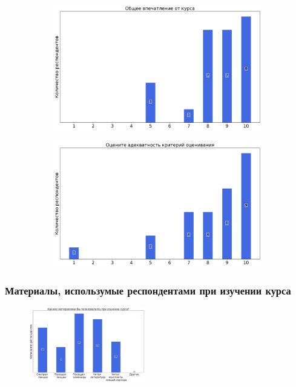 		\begin{figure}[H]
			\centering
			\begin{subfigure}[b]{0.45\textwidth}
				\centering
				\includegraphics[width=\textwidth]{images/2 course/Аналитическая механика/general-0.png}
			\end{subfigure}
			\begin{subfigure}[b]{0.45\textwidth}
				\centering
				\includegraphics[width=\textwidth]{images/2 course/Аналитическая механика/general-1.png}
			\end{subfigure}	
		\end{figure}

	\subsubsection{Материалы, использумые респондентами при изучении курса}

		\begin{figure}[H]
			\centering
			\includegraphics[width = 0.45\textwidth]{images/2 course/Аналитическая механика/materials.png}
		\end{figure}

